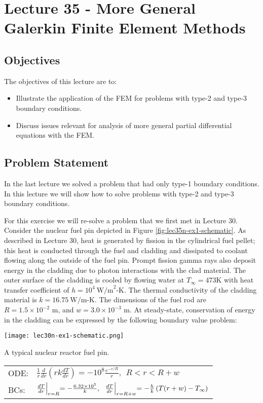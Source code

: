 \chapter{Lecture 35 - More General Galerkin Finite Element Methods}
\label{ch:lec35n}
\section{Objectives}
The objectives of this lecture are to:
\begin{itemize}
\item Illustrate the application of the FEM for problems with type-2 and type-3 boundary conditions.
\item Discuss issues relevant for analysis of more general partial differential equations with the FEM.
\end{itemize}
\setcounter{lstannotation}{0}

\section{Problem Statement}
In the last lecture we solved a problem that had only type-1 boundary conditions.  In this lecture we will show how to solve problems with type-2 and type-3 boundary conditions.  

For this exercise we will re-solve a problem that we first met in Lecture 30. Consider the nuclear fuel pin depicted in Figure \ref{fig:lec35n-ex1-schematic}.  As described in Lecture 30,  heat is generated by fission in the cylindrical fuel pellet; this heat is conducted through the fuel and cladding and dissipated to coolant flowing along the outside of the fuel pin.  Prompt fission gamma rays also deposit energy in the cladding due to photon interactions with the clad material.  The outer surface of the cladding is cooled by flowing water at $T_{\infty}=473$K with heat transfer coefficient of $h=10^4\ \text{W/m}^2\text{-K}$.  The thermal conductivity of the cladding material is $k=16.75 \ \text{W/m-K}$.  The dimensions of the fuel rod are $R=1.5\times 10^{-2}\text{ m}$, and $w=3.0\times 10^{-3}\text{ m}$.  At steady-state, conservation of energy in the cladding can be expressed by the following boundary value problem:
\begin{marginfigure}
\texttt{[image: lec30n-ex1-schematic.png]}
\caption{A typical nuclear reactor fuel pin.}
\label{fig:lec35n-ex1-schematic}
\end{marginfigure}
\begin{table}[h!]
\begin{tabular}{l l}
ODE: & $\frac{1}{r}\frac{d}{dr}\left(rk\frac{dT}{dr}\right)=-10^8\frac{e^{-r/R}}{r}, \ \  R < r < R+w $ \\
BCs: & $\frac{dT}{dr}\Bigl|_{r=R}=-\frac{6.32\times 10^5}{k}, \ \ \frac{dT}{dr}\Bigl|_{r=R+w}=-\frac{h}{k}\left(T(r+w)-T_{\infty}\right)$ \\
\end{tabular}
\end{table}

